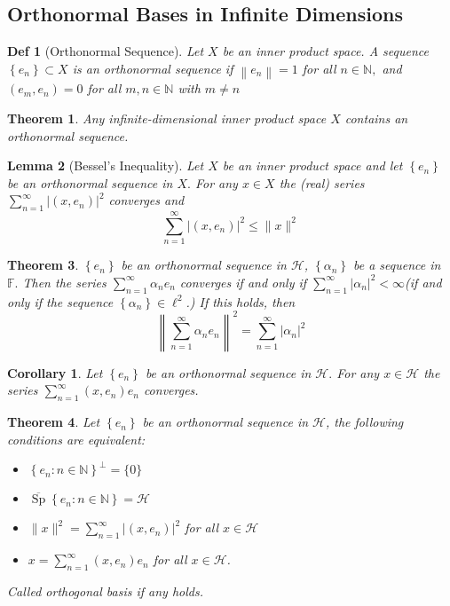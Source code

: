 \documentclass[10pt]{paper}
\newtheorem{theorem}{Theorem}[section]
\newtheorem{definition}{Def}[section]
\newtheorem{corollary}{Corollary}[section]
\newtheorem{lemma}[theorem]{Lemma}
\begin{document}
\subsection{Orthonormal Bases in Infinite Dimensions}

\begin{definition}[Orthonormal Sequence]
    Let $X$ be an inner product space. A sequence $\left\{e_{n}\right\} \subset X$ is  an orthonormal sequence if $\left\|e_{n}\right\|=1$ for all $n \in \mathbb{N},$ and $\left(e_{m}, e_{n}\right)=0$ for all $m, n \in \mathbb{N}$ with $m \neq n$
\end{definition}

\begin{theorem}
    Any infinite-dimensional inner product space $X$ contains an orthonormal sequence.
\end{theorem}

\begin{lemma}[Bessel’s Inequality]
    Let $X$ be an inner product space and let $\left\{e_{n}\right\}$ be an orthonormal sequence in $X .$ For any $x \in X$ the (real) series $\sum_{n=1}^{\infty}\left|\left(x, e_{n}\right)\right|^{2}$ converges and
    $$\sum_{n=1}^{\infty}\left|\left(x, e_{n}\right)\right|^{2} \leq\|x\|^{2}$$
\end{lemma}

\begin{theorem}
    $\left\{e_{n}\right\}$ be an orthonormal sequence in $\mathcal{H}$, $\left\{\alpha_{n}\right\}$ be a sequence in $\mathbb{F} .$ Then the series $\sum_{n=1}^{\infty} \alpha_{n} e_{n}$ converges if and only if $\sum_{n=1}^{\infty}\left|\alpha_{n}\right|^{2}<\infty$(if and only if the sequence $\left\{\alpha_{n}\right\} \in \ell^{2}$.) If this holds, then
    $$
        \left\|\sum_{n=1}^{\infty} \alpha_{n} e_{n}\right\|^{2}=\sum_{n=1}^{\infty}\left|\alpha_{n}\right|^{2}
    $$
\end{theorem}

\begin{corollary}
    Let $\left\{e_{n}\right\}$ be an orthonormal sequence in $\mathcal{H} .$ For any $x \in \mathcal{H}$ the series $\sum_{n=1}^{\infty}\left(x, e_{n}\right) e_{n}$ converges.
\end{corollary}

\begin{theorem}
    Let $\left\{e_{n}\right\}$ be an orthonormal sequence in $\mathcal{H}$, the following conditions are equivalent:
    \begin{itemize}
        \item $\left\{e_{n}: n \in \mathbb{N}\right\}^{\perp}=\{0\}$
        \item $\overline{\operatorname{Sp}}\left\{e_{n}: n \in \mathbb{N}\right\}=\mathcal{H}$
        \item $\|x\|^{2}=\sum_{n=1}^{\infty}\left|\left(x, e_{n}\right)\right|^{2}$ for all $x \in \mathcal{H}$
        \item $x=\sum_{n=1}^{\infty}\left(x, e_{n}\right) e_{n}$ for all $x \in \mathcal{H}$.
    \end{itemize}
    Called orthogonal basis if any holds.
\end{theorem}
\end{document}
